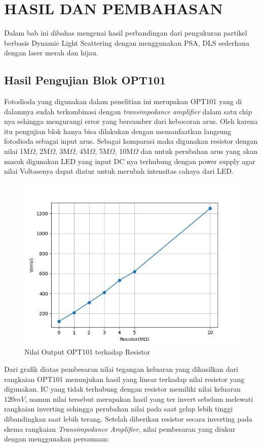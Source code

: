 \chapter{HASIL DAN PEMBAHASAN}

Dalam bab ini dibahas mengenai hasil perbandingan dari pengukuran
partikel berbasis Dynamic Light Scattering dengan menggunakan
PSA, DLS sederhana dengan laser merah dan hijau.

\section{Hasil Pengujian Blok OPT101}
Fotodioda yang digunakan dalam penelitian ini merupakan OPT101
yang di dalamnya sudah terkombinasi dengan \textit{transimpedance
amplifier} dalam satu chip nya sehingga mengurangi error yang
bersumber dari kebocoran arus. Oleh karena itu pengujian blok
hanya bisa dilakukan dengan memanfaatkan langsung fotodioda
sebagai input arus. Sebagai komparasi maka digunakan resistor
dengan nilai 1M${\Omega}$, 2M${\Omega}$, 3M${\Omega}$, 
4M${\Omega}$, 5M${\Omega}$, 10M${\Omega}$ dan untuk perubahan 
arus yang akan masuk digunakan LED yang input DC nya terhubung 
dengan power supply agar nilai Voltasenya dapat diatur untuk 
merubah intensitas cahaya dari LED. 

\begin{figure}[H]
  \centering
  \includegraphics[width=12cm]{Images/Gain1.png}
  \caption{Nilai Output OPT101 terhadap Resistor}
  \label{fig:gain_res}
\end{figure}

Dari grafik diatas pembesaran nilai tegangan keluaran yang
dihasilkan dari rangkaian OPT101 menunjukan hasil yang linear
terhadap nilai resistor yang digunakan. IC yang tidak terhubung
dengan resistor memiliki nilai keluaran ${120mV}$, namun nilai
tersebut merupakan hasil yang ter invert sebelum melewati
rangkaian inverting sehingga perubahan nilai pada saat gelap
lebih tinggi dibandingkan saat lebih terang. Setelah diberikan
resistor secara inverting pada skema rangkaian \textit{Transimpedance
Amplifier}, nilai pembesaran yang diukur dengan menggunakan
persamaan:

